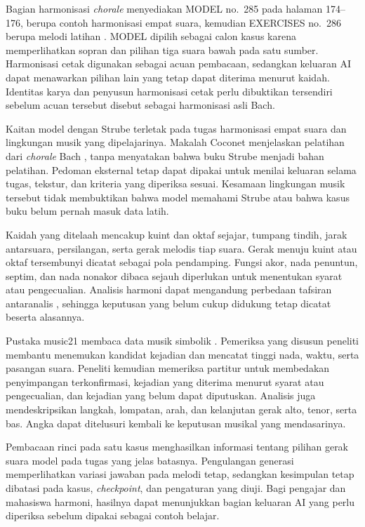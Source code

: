 Bagian harmonisasi \textit{chorale} menyediakan MODEL no.~285 pada halaman 174--176, berupa contoh harmonisasi empat suara, kemudian EXERCISES no.~286 berupa melodi latihan \parencite[174--176]{strube1928}. MODEL dipilih sebagai calon kasus karena memperlihatkan sopran dan pilihan tiga suara bawah pada satu sumber. Harmonisasi cetak digunakan sebagai acuan pembacaan, sedangkan keluaran AI dapat menawarkan pilihan lain yang tetap dapat diterima menurut kaidah. Identitas karya dan penyusun harmonisasi cetak perlu dibuktikan tersendiri sebelum acuan tersebut disebut sebagai harmonisasi asli Bach.

Kaitan model dengan Strube terletak pada tugas harmonisasi empat suara dan lingkungan musik yang dipelajarinya. Makalah Coconet menjelaskan pelatihan dari \textit{chorale} Bach \parencite{huang2017}, tanpa menyatakan bahwa buku Strube menjadi bahan pelatihan. Pedoman eksternal tetap dapat dipakai untuk menilai keluaran selama tugas, tekstur, dan kriteria yang diperiksa sesuai. Kesamaan lingkungan musik tersebut tidak membuktikan bahwa model memahami Strube atau bahwa kasus buku belum pernah masuk data latih.

Kaidah yang ditelaah mencakup kuint dan oktaf sejajar, tumpang tindih, jarak antarsuara, persilangan, serta gerak melodis tiap suara. Gerak menuju kuint atau oktaf tersembunyi dicatat sebagai pola pendamping. Fungsi akor, nada penuntun, septim, dan nada nonakor dibaca sejauh diperlukan untuk menentukan syarat atau pengecualian. Analisis harmoni dapat mengandung perbedaan tafsiran antaranalis \parencite[66]{conditschultz2018}, sehingga keputusan yang belum cukup didukung tetap dicatat beserta alasannya.

Pustaka music21 membaca data musik simbolik \parencite{cuthbert2010}. Pemeriksa yang disusun peneliti membantu menemukan kandidat kejadian dan mencatat tinggi nada, waktu, serta pasangan suara. Peneliti kemudian memeriksa partitur untuk membedakan penyimpangan terkonfirmasi, kejadian yang diterima menurut syarat atau pengecualian, dan kejadian yang belum dapat diputuskan. Analisis juga mendeskripsikan langkah, lompatan, arah, dan kelanjutan gerak alto, tenor, serta bas. Angka dapat ditelusuri kembali ke keputusan musikal yang mendasarinya.

Pembacaan rinci pada satu kasus menghasilkan informasi tentang pilihan gerak suara model pada tugas yang jelas batasnya. Pengulangan generasi memperlihatkan variasi jawaban pada melodi tetap, sedangkan kesimpulan tetap dibatasi pada kasus, \textit{checkpoint}, dan pengaturan yang diuji. Bagi pengajar dan mahasiswa harmoni, hasilnya dapat menunjukkan bagian keluaran AI yang perlu diperiksa sebelum dipakai sebagai contoh belajar.

